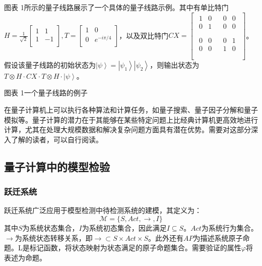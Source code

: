 图表 1所示的量子线路展示了一个具体的量子线路示例。其中有单比特门\(H=\frac{1}{\sqrt2}\left[\begin{matrix}1&1\\1&-1\\\end{matrix}\right],T=\left[\begin{matrix}1&0\\0&e^{-i\pi/4}\\\end{matrix}\right]\)，以及双比特门\(CX=\left[\begin{matrix}\begin{matrix}1&0\\0&1\\\end{matrix}&\begin{matrix}0&0\\0&0\\\end{matrix}\\\begin{matrix}0&0\\0&0\\\end{matrix}&\begin{matrix}0&1\\1&0\\\end{matrix}\\\end{matrix}\right]\)。假设该量子线路的初始状态为\(\left|\psi\right\rangle=\left|\psi_1\right\rangle\left|\psi_2\right\rangle\)，则输出状态为\(T\otimes H\cdot CX\cdot T\otimes H\cdot\left|\psi\right\rangle\)。

图表 1一个量子线路的例子

在量子计算机上可以执行各种算法和计算任务，如量子搜索\citep{Grover_1996}、量子因子分解\citep{shor}和量子模拟\citep{Feynman}等。量子计算的潜力在于其能够在某些特定问题上比经典计算机更高效地进行计算，尤其在处理大规模数据和解决复杂问题方面具有潜在优势。需要对这部分深入了解的读者，可以自行阅读\citep{nielsen2010quantum}。
\subsection{量子计算中的模型检验}
\subsubsection{跃迁系统}
跃迁系统广泛应用于模型检测中待检测系统的建模，其定义为\citep{baier2008principles}：
\begin{equation}
\mathcal{M}=\{S,Act,\rightarrow,I\}
\end{equation}
其中\(S\)为系统状态集合，\(I\)为系统初态集合，因此满足\(I\subseteq S\)。\(Act\)为系统行为集合。\(\rightarrow\)为系统状态转移关系，即\(\rightarrow\subset S\times Act\times S\)。此外还有\(AP\)为描述系统原子命题。L是标记函数，将状态映射为状态满足的原子命题集合。需要验证的属性\(\varphi\)将表述为命题。


